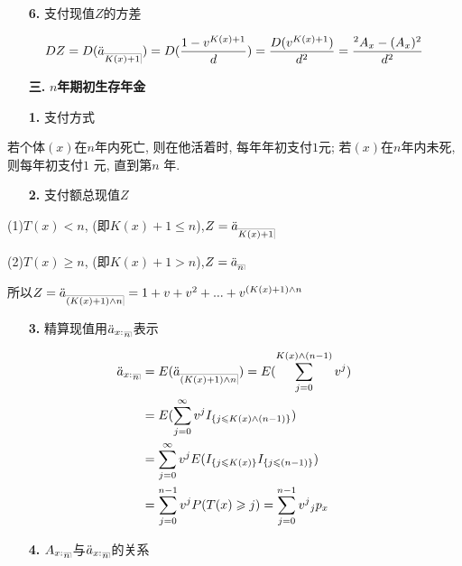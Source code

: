 \documentclass[a4paper,10pt]{ctexbook}
\makeatletter
\newcommand{\hei}{\CJKfamily{hei}}      %
\DeclareRobustCommand{\annu}[1]{_{%
    \def\arraystretch{0}%
    \setlength\arraycolsep{1pt}%
    \setlength\arrayrulewidth{.2pt}%
    \begin{array}[b]{@{}c|}\hline
        \\[\arraycolsep]%
        \scriptstyle #1%
    \end{array}%
}}
\makeatother
\begin{document}
\begin{itemize}
    \item[{\bf\hei 6.}]支付现值$Z$的方差
\end{itemize}

\begin{align*}
    DZ=D(\ddot a_{\annu {K(x)+1}})=D(\frac{1-v^{K(x)+1}}{d})=\frac{D(v^{K(x)+1})}{d^2}=\frac{{}^2A_x-(A_x)^2}{d^2}
\end{align*}

\begin{itemize}
    \item[{\bf\hei 三.}]{\bf\hei $n$年期初生存年金}
\end{itemize}

\begin{itemize}
    \item[{\bf\hei 1.}]支付方式
\end{itemize}

若个体$(x)$在$n$年内死亡, 则在他活着时, 每年年初支付$1$元; 若$(x)$在$n$年内未死, 则每年初支付$1$ 元, 直到第$n$ 年.

\begin{itemize}
    \item[{\bf\hei 2.}]支付额总现值$Z$
\end{itemize}

(1)$T(x)<n$, (即$K(x)+1\leqslant n$),$Z=\ddot a_{\annu {K(x)+1}}$

(2)$T(x)\geqslant n$, (即$K(x)+1>n$),$Z=\ddot a_{\annu {n}}$

所以$Z=\ddot a_{\annu {(K(x)+1)\land n}}=1+v+v^2+...+v^{(K(x)+1)\land n}$
\begin{itemize}
    \item[{\bf\hei 3.}]精算现值用$\ddot a_{x:}{}_{\annu n}$表示
\end{itemize}
\begin{align*}
    \ddot a_{x:}{}_{\annu n} & = E(\ddot a_{\annu {(K(x)+1)\land n}})=E(\sum_{j=0}^{K(x)\land (n-1)}{v^j}) \\
                             & =E(\sum_{j=0}^{\infty}{v^j}I_{\{j\leqslant K(x)\land(n-1)\}})               \\
                             & =\sum_{j=0}^{\infty}{v^j}E(I_{\{j\leqslant K(x)\}}I_{\{j\leqslant (n-1)\}}) \\
                             & =\sum_{j=0}^{n-1}{v^j}P(T(x)\geqslant j)=\sum_{j=0}^{n-1}{v^j}{}_j p_x      \\
\end{align*}

\begin{itemize}
    \item[{\bf\hei 4.}]$A_{x:}{}_{\annu n}$与$\ddot a_{x:}{}_{\annu n}$的关系
\end{itemize}
\end{document}

